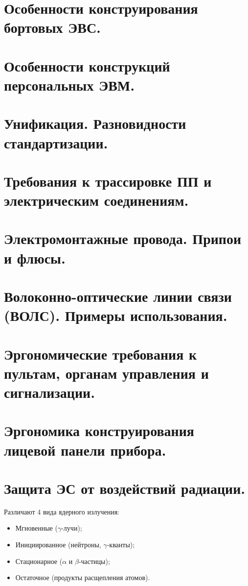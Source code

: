 \documentclass[unicode, 12pt, a4paper, oneside]{article}
\begin{document}
\section{Особенности конструирования бортовых ЭВС.}
\section{Особенности конструкций персональных ЭВМ.}
\section{Унификация. Разновидности стандартизации.}
\section{Требования к трассировке ПП и электрическим соединениям.}
\section{Электромонтажные провода. Припои и флюсы.}
\section{Волоконно-оптические линии связи (ВОЛС). Примеры использования.}
\section{Эргономические требования к пультам, органам управления и сигнализации.}
\section{Эргономика конструирования лицевой панели прибора.}

\section{Защита ЭС от воздействий радиации.}

Различают 4 вида ядерного излучения:

\begin{itemize}
\item Мгновенные ($\gamma$-лучи);
\item Инициированное (нейтроны, $\gamma$-кванты);
\item Стационарное ($\alpha$ и $\beta$-частицы);
\item Остаточное  (продукты расщепления атомов).
\end{itemize}
\end{document}
